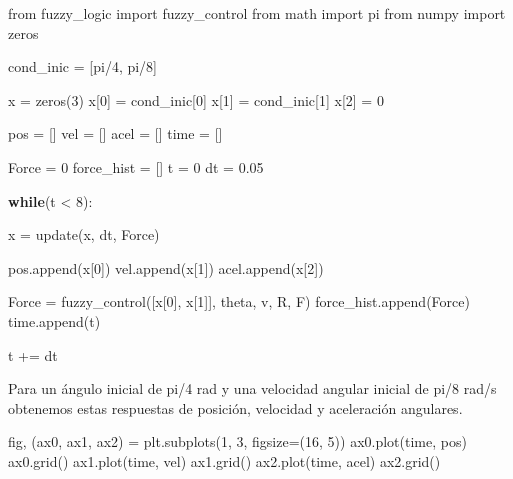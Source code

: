 \documentclass[onecolumn]{article}
\newenvironment{Shaded}{}{}
\newcommand{\ControlFlowTok}[1]{\textcolor[rgb]{0.00,0.44,0.13}{\textbf{#1}}}
\newcommand{\DecValTok}[1]{\textcolor[rgb]{0.25,0.63,0.44}{#1}}
\newcommand{\FloatTok}[1]{\textcolor[rgb]{0.25,0.63,0.44}{#1}}
\newcommand{\ImportTok}[1]{#1}
\newcommand{\NormalTok}[1]{#1}
\newcommand{\OperatorTok}[1]{\textcolor[rgb]{0.40,0.40,0.40}{#1}}
\begin{document}
\begin{Shaded}
\begin{Highlighting}[]
\ImportTok{from}\NormalTok{ fuzzy_logic }\ImportTok{import}\NormalTok{ fuzzy_control}
\ImportTok{from}\NormalTok{ math }\ImportTok{import}\NormalTok{ pi}
\ImportTok{from}\NormalTok{ numpy }\ImportTok{import}\NormalTok{ zeros}

\NormalTok{cond_inic }\OperatorTok{=}\NormalTok{ [pi}\OperatorTok{/}\DecValTok{4}\NormalTok{, pi}\OperatorTok{/}\DecValTok{8}\NormalTok{]}

\NormalTok{x }\OperatorTok{=}\NormalTok{ zeros(}\DecValTok{3}\NormalTok{)}
\NormalTok{x[}\DecValTok{0}\NormalTok{] }\OperatorTok{=}\NormalTok{ cond_inic[}\DecValTok{0}\NormalTok{]}
\NormalTok{x[}\DecValTok{1}\NormalTok{] }\OperatorTok{=}\NormalTok{ cond_inic[}\DecValTok{1}\NormalTok{]}
\NormalTok{x[}\DecValTok{2}\NormalTok{] }\OperatorTok{=} \DecValTok{0}

\NormalTok{pos }\OperatorTok{=}\NormalTok{ []}
\NormalTok{vel }\OperatorTok{=}\NormalTok{ []}
\NormalTok{acel }\OperatorTok{=}\NormalTok{ []}
\NormalTok{time }\OperatorTok{=}\NormalTok{ []}

\NormalTok{Force }\OperatorTok{=} \DecValTok{0}
\NormalTok{force_hist }\OperatorTok{=}\NormalTok{ []}
\NormalTok{t }\OperatorTok{=} \DecValTok{0}
\NormalTok{dt }\OperatorTok{=} \FloatTok{0.05}


\ControlFlowTok{while}\NormalTok{(t }\OperatorTok{<} \DecValTok{8}\NormalTok{):}

\NormalTok{    x }\OperatorTok{=}\NormalTok{ update(x, dt, Force)}

\NormalTok{    pos.append(x[}\DecValTok{0}\NormalTok{])}
\NormalTok{    vel.append(x[}\DecValTok{1}\NormalTok{])}
\NormalTok{    acel.append(x[}\DecValTok{2}\NormalTok{])}

\NormalTok{    Force }\OperatorTok{=}\NormalTok{ fuzzy_control([x[}\DecValTok{0}\NormalTok{], x[}\DecValTok{1}\NormalTok{]], theta, v, R, F)}
\NormalTok{    force_hist.append(Force)}
\NormalTok{    time.append(t)}

\NormalTok{    t }\OperatorTok{+=}\NormalTok{ dt}
\end{Highlighting}
\end{Shaded}

Para un ángulo inicial de pi/4 rad y una velocidad angular inicial de
pi/8 rad/s obtenemos estas respuestas de posición, velocidad y
aceleración angulares.

\begin{Shaded}
\begin{Highlighting}[]
\NormalTok{fig, (ax0, ax1, ax2) }\OperatorTok{=}\NormalTok{ plt.subplots(}\DecValTok{1}\NormalTok{, }\DecValTok{3}\NormalTok{, figsize}\OperatorTok{=}\NormalTok{(}\DecValTok{16}\NormalTok{, }\DecValTok{5}\NormalTok{))}
\NormalTok{ax0.plot(time, pos)}
\NormalTok{ax0.grid()}
\NormalTok{ax1.plot(time, vel)}
\NormalTok{ax1.grid()}
\NormalTok{ax2.plot(time, acel)}
\NormalTok{ax2.grid()}
\end{Highlighting}
\end{Shaded}
\end{document}

